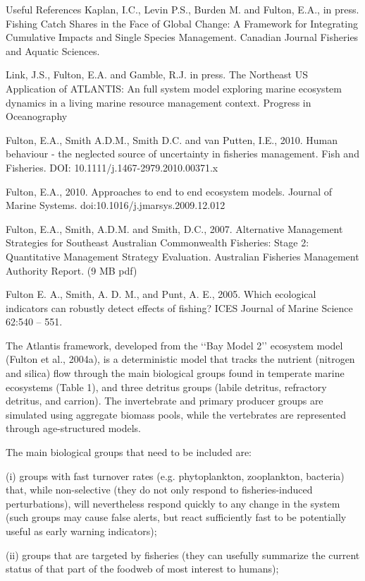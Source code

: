 \documentclass{report}
\begin{document}
Useful References
Kaplan, I.C., Levin P.S., Burden M. and Fulton, E.A., in press. Fishing Catch Shares in the Face of Global Change: A Framework for Integrating Cumulative Impacts and Single Species Management. Canadian Journal Fisheries and Aquatic Sciences.

Link, J.S., Fulton, E.A. and Gamble, R.J. in press. The Northeast US Application of ATLANTIS: An full system model exploring marine ecosystem dynamics in a living marine resource management context. Progress in Oceanography

Fulton, E.A., Smith A.D.M., Smith D.C. and van Putten, I.E., 2010. Human behaviour - the neglected source of uncertainty in fisheries management. Fish and Fisheries. DOI: 10.1111/j.1467-2979.2010.00371.x

Fulton, E.A., 2010. Approaches to end to end ecosystem models. Journal of Marine Systems. doi:10.1016/j.jmarsys.2009.12.012 


Fulton, E.A., Smith, A.D.M. and Smith, D.C., 2007. Alternative Management Strategies for Southeast Australian Commonwealth Fisheries: Stage 2: Quantitative Management Strategy Evaluation. Australian Fisheries Management Authority Report. (9 MB pdf)

Fulton E. A., Smith, A. D. M., and Punt, A. E., 2005. Which ecological indicators can robustly detect effects of fishing? ICES Journal of Marine Science 62:540 – 551.

The Atlantis framework, developed from the ‘‘Bay Model 2’’ ecosystem model (Fulton et al., 2004a), is a deterministic model that tracks the nutrient (nitrogen and silica) flow through the main biological groups found in temperate marine ecosystems (Table 1), and three detritus
groups (labile detritus, refractory detritus, and carrion). The invertebrate and primary producer groups are simulated using aggregate biomass pools, while the vertebrates are
represented through age-structured models.

The main biological groups that need to be included are:

(i) groups with fast turnover rates (e.g. phytoplankton, zooplankton, bacteria) that, while non-selective (they do not only respond to fisheries-induced perturbations), will nevertheless respond quickly to any change in the system (such groups may cause false alerts, but react sufficiently fast to be potentially useful as early warning indicators);

(ii) groups that are targeted by fisheries (they can usefully summarize the current status of that part of the foodweb of most interest to humans);
\end{document}
